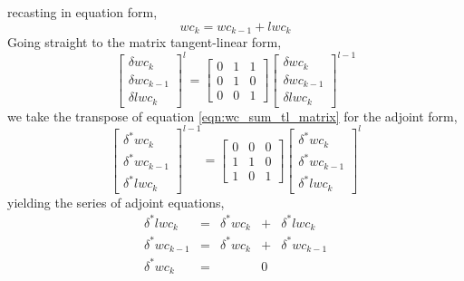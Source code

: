 recasting in equation form,
\begin{equation}
  wc_k = wc_{k-1} + lwc_k
  \label{eqn:wc_sum}
\end{equation}
Going straight to the matrix tangent-linear form,
\begin{equation}
  \left[ 
    \begin{array}{c}
      \delta wc_k \\
      \delta wc_{k-1} \\
      \delta lwc_k
    \end{array}
  \right]^{l} =
  \left[ 
    \begin{array}{ccc}
      0 & 1 & 1 \\
      0 & 1 & 0 \\
      0 & 0 & 1
    \end{array}
  \right]
  \left[ 
    \begin{array}{c}
      \delta wc_k \\
      \delta wc_{k-1} \\
      \delta lwc_k
    \end{array}
  \right]^{l-1}
  \label{eqn:wc_sum_tl_matrix}
\end{equation}
we take the transpose of equation \ref{eqn:wc_sum_tl_matrix} for the adjoint form,
\begin{equation}
  \left[ 
    \begin{array}{c}
      \delta^* wc_k \\
      \delta^* wc_{k-1} \\
      \delta^* lwc_k 
    \end{array}
  \right]^{l-1} =
  \left[ 
    \begin{array}{ccc}
      0 & 0 & 0 \\
      1 & 1 & 0 \\
      1 & 0 & 1
    \end{array}
  \right]
  \left[ 
    \begin{array}{c}
      \delta^* wc_k \\
      \delta^* wc_{k-1} \\
      \delta^* lwc_k
    \end{array}
  \right]^{l}
  \label{eqn:wc_sum_ad_matrix}
\end{equation}
yielding the series of adjoint equations,
\begin{equation}
  \begin{array}{rcrcl}
    \delta^* lwc_k    & = & \delta^* wc_k & + & \delta^* lwc_k    \\
    \delta^* wc_{k-1} & = & \delta^* wc_k & + & \delta^* wc_{k-1} \\
    \delta^* wc_k     & = &               & 0 &
  \end{array}
  \label{eqn:wc_sum_ad}
\end{equation}
